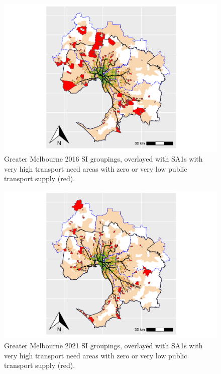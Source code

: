 \documentclass[preprint, 3p,
authoryear]{elsarticle} %
\begin{document}
\begin{figure}
\includegraphics[width=1\linewidth]{ReynoldsCurrieQu2024_files/figure-latex/Greater_Melbourne_2016_needs_gap_map_figure-1} \caption{Greater Melbourne 2016 SI groupings, overlayed with SA1s with very high transport need areas with zero or very low public transport supply (red).}\label{fig:Greater_Melbourne_2016_needs_gap_map_figure}
\end{figure}

\begin{figure}
\includegraphics[width=1\linewidth]{ReynoldsCurrieQu2024_files/figure-latex/Greater_Melbourne_2021_needs_gap_map_figure-1} \caption{Greater Melbourne 2021 SI groupings, overlayed with SA1s with very high transport need areas with zero or very low public transport supply (red).}\label{fig:Greater_Melbourne_2021_needs_gap_map_figure}
\end{figure}
\end{document}
